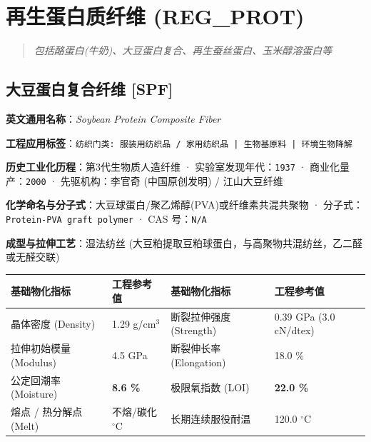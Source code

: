 \documentclass[11pt,openright,twoside,UTF8]{ctexbook}
\begin{document}
\chapter{再生蛋白质纤维 (REG\_PROT)}
\begin{quote}
\small\itshape
包括酪蛋白(牛奶)、大豆蛋白复合、再生蚕丝蛋白、玉米醇溶蛋白等
\end{quote}

\section{大豆蛋白复合纤维 [SPF]}
\label{sec:spf}

\noindent\textbf{英文通用名称}：\textit{Soybean Protein Composite Fiber}\par
\noindent\textbf{工程应用标签}：\texttt{纺织门类: 服装用纺织品 / 家用纺织品 | 生物基原料 | 环境生物降解}\par
\noindent\textbf{历史工业化历程}：第3代生物质人造纤维 · 实验室发现年代：\texttt{1937} · 商业化量产：\texttt{2000} · 先驱机构：李官奇 (中国原创发明) / 江山大豆纤维\par
\noindent\textbf{化学命名与分子式}：大豆球蛋白/聚乙烯醇(PVA)或纤维素共混共聚物 · 分子式：\texttt{Protein-PVA graft polymer} · CAS 号：\texttt{N/A}\par
\noindent\textbf{成型与拉伸工艺}：湿法纺丝 (大豆粕提取豆粕球蛋白，与高聚物共混纺丝，乙二醛或无醛交联)\par

\vspace{0.15cm}
\begin{center}
\small
\begin{tabularx}{\textwidth}{p{3.8cm}Xp{3.8cm}X}
\toprule
\textbf{基础物化指标} & \textbf{工程参考值} & \textbf{基础物化指标} & \textbf{工程参考值} \\
\midrule
晶体密度 (Density) & 1.29 g/cm$^3$ & 断裂拉伸强度 (Strength) & 0.39 GPa (3.0 cN/dtex) \\
拉伸初始模量 (Modulus) & 4.5 GPa & 断裂伸长率 (Elongation) & 18.0 \% \\
公定回潮率 (Moisture) & \textbf{8.6 \%} & 极限氧指数 (LOI) & \textbf{22.0 \%} \\
熔点 / 热分解点 (Melt) & 不熔/碳化 $^\circ\mathrm{C}$ & 长期连续服役耐温 & 120.0 $^\circ\mathrm{C}$ \\
\bottomrule
\end{tabularx}
\end{center}
\vspace{0.15cm}
\end{document}
